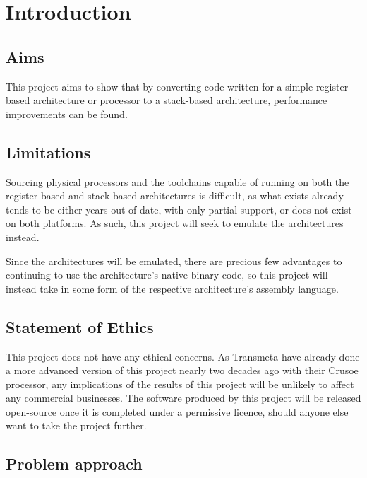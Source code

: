 \chapter{Introduction}
\section{Aims}
This project aims to show that by converting code written for a simple
register-based architecture or processor to a stack-based architecture,
performance improvements can be found.

\section{Limitations}
Sourcing physical processors and the toolchains capable of running on both the
register-based and stack-based architectures is difficult, as what exists
already tends to be either years out of date, with only partial support, or does
not exist on both platforms. As such, this project will seek to emulate the
architectures instead.

Since the architectures will be emulated, there are precious few advantages to
continuing to use the architecture's native binary code, so this project will
instead take in some form of the respective architecture's assembly language.

\section{Statement of Ethics}
This project does not have any ethical concerns. As Transmeta have already done
a more advanced version of this project nearly two decades ago with their Crusoe
processor, any implications of the results of this project will be unlikely to
affect any commercial businesses. The software produced by this project will be
released open-source once it is completed under a permissive licence, should
anyone else want to take the project further.

\section{Problem approach}

